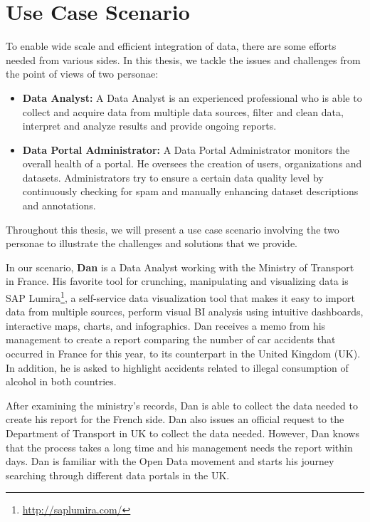\section{Use Case Scenario}\label{section:scenario}

To enable wide scale and efficient integration of data, there are some efforts needed from various sides. In this thesis, we tackle the issues and challenges from the point of views of two personae:

\begin{itemize}
	\item \textbf{Data Analyst:} A Data Analyst is an experienced professional who is able to collect and acquire data from multiple data sources, filter and clean data, interpret and analyze results and provide ongoing reports.
	\item \textbf{Data Portal Administrator:} A Data Portal Administrator monitors the overall health of a portal. He oversees the creation of users, organizations and datasets. Administrators try to ensure a certain data quality level by continuously checking for spam and manually enhancing dataset descriptions and annotations.
\end{itemize}

Throughout this thesis, we will present a use case scenario involving the two personae to illustrate the challenges and solutions that we provide.

In our scenario, \textbf{Dan} is a Data Analyst working with the Ministry of Transport in France. His favorite tool for crunching, manipulating and visualizing data is SAP Lumira\footnote{\url{http://saplumira.com/}}, a self-service data visualization tool that makes it easy to import data from multiple sources, perform visual BI analysis using intuitive dashboards, interactive maps, charts, and infographics. Dan receives a memo from his management to create a report comparing the number of car accidents that occurred in France for this year, to its counterpart in the United Kingdom (UK). In addition, he is asked to highlight accidents related to illegal consumption of alcohol in both countries.

After examining the ministry's records, Dan is able to collect the data needed to create his report for the French side. Dan also issues an official request to the Department of Transport in UK to collect the data needed. However, Dan knows that the process takes a long time and his management needs the report within days. Dan is familiar with the Open Data movement and starts his journey searching through different data portals in the UK.

